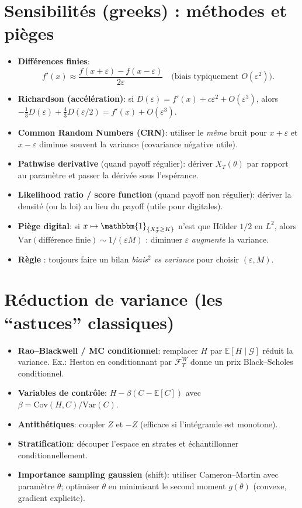 \documentclass[11pt,a4paper]{article}
\newcommand{\E}{\mathbb{E}}
\newcommand{\1}{\mathbbm{1}}
\newcommand{\Var}{\mathrm{Var}}
\newcommand{\Cov}{\mathrm{Cov}}
\theoremstyle{plain}
\theoremstyle{definition}
\begin{document}
\section{Sensibilités (greeks) : méthodes et pièges}
\begin{itemize}[leftmargin=*]
  \item \textbf{Différences finies}:
  \[
  f'(x)\approx \frac{f(x+\varepsilon)-f(x-\varepsilon)}{2\varepsilon}
  \quad\text{(biais typiquement }O(\varepsilon^2)\text{)}.
  \]
  \item \textbf{Richardson (accélération)}:
  si $D(\varepsilon)=f'(x)+c\varepsilon^2+O(\varepsilon^3)$, alors
  $-\frac13D(\varepsilon)+\frac43D(\varepsilon/2)=f'(x)+O(\varepsilon^3)$.
  \item \textbf{Common Random Numbers (CRN)}: utiliser le \emph{même} bruit pour $x+\varepsilon$ et $x-\varepsilon$ diminue souvent la variance (covariance négative utile).
  \item \textbf{Pathwise derivative} (quand payoff régulier): dériver $X_T(\theta)$ par rapport au paramètre et passer la dérivée sous l'espérance.
  \item \textbf{Likelihood ratio / score function} (quand payoff non régulier): dériver la densité (ou la loi) au lieu du payoff (utile pour digitales).
  \item \textbf{Piège digital}:
  si $x\mapsto \1_{\{X_T^x\ge K\}}$ n'est que Hölder $1/2$ en $L^2$, alors
  $\Var(\text{différence finie})\sim 1/(\varepsilon M)$ : diminuer $\varepsilon$ \emph{augmente} la variance.
  \item \textbf{Règle} : toujours faire un bilan \emph{biais$^2$ vs variance} pour choisir $(\varepsilon,M)$.
\end{itemize}

\section{Réduction de variance (les ``astuces'' classiques)}
\begin{itemize}[leftmargin=*]
  \item \textbf{Rao--Blackwell / MC conditionnel}: remplacer $H$ par $\E[H\mid\mathcal G]$ réduit la variance.
  Ex.: Heston en conditionnant par $\mathcal F_T^W$ donne un prix Black--Scholes conditionnel.
  \item \textbf{Variables de contrôle}: $H-\beta(C-\E[C])$ avec $\beta=\Cov(H,C)/\Var(C)$.
  \item \textbf{Antithétiques}: coupler $Z$ et $-Z$ (efficace si l'intégrande est monotone).
  \item \textbf{Stratification}: découper l'espace en strates et échantillonner conditionnellement.
  \item \textbf{Importance sampling gaussien} (shift): utiliser Cameron--Martin avec paramètre $\theta$; optimiser $\theta$ en minimisant le second moment $g(\theta)$ (convexe, gradient explicite).
\end{itemize}
\end{document}
